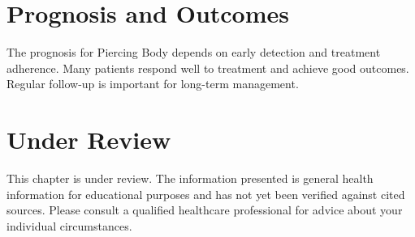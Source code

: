 \section*{Prognosis and Outcomes}
The prognosis for Piercing Body depends on early detection and treatment adherence. Many patients respond well to treatment and achieve good outcomes. Regular follow-up is important for long-term management.
\section*{Under Review}
This chapter is under review. The information presented is general health information for educational purposes and has not yet been verified against cited sources. Please consult a qualified healthcare professional for advice about your individual circumstances.


\clearpage
